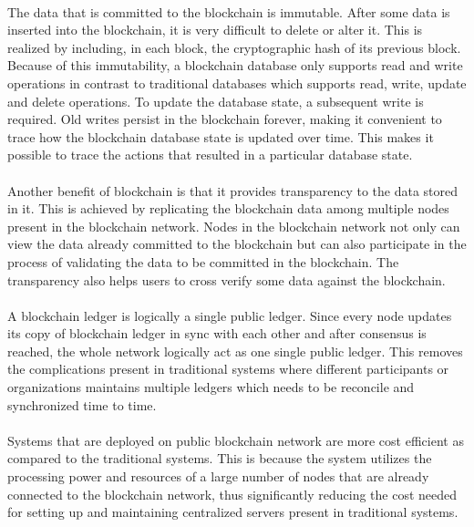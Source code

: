 \documentclass{article}
\begin{document}
        \paragraph{}
        The data that is committed to the blockchain is immutable. After some data is inserted into the blockchain, it is very difficult to delete or alter it. This is realized by including, in each block, the cryptographic hash of its previous block. Because of this immutability, a blockchain database only supports read and write operations in contrast to traditional databases which supports read, write, update and delete operations. To update the database state, a subsequent write is required. Old writes persist in the blockchain forever, making it convenient to trace how the blockchain database state is updated over time. This makes it possible to trace the actions that resulted in a particular database state.

        \paragraph{}
        Another benefit of blockchain is that it provides transparency to the data stored in it. This is achieved by replicating the blockchain data among multiple nodes present in the blockchain network. Nodes in the blockchain network not only can view the data already committed to the blockchain but can also participate in the process of validating the data to be committed in the blockchain. The transparency also helps users to cross verify some data against the blockchain.  

        \paragraph{}
        A blockchain ledger is logically a single public ledger. Since every node updates its copy of blockchain ledger in sync with each other and after consensus is reached, the whole network logically act as one single public ledger. This removes the complications present in traditional systems where different participants or organizations maintains multiple ledgers which needs to be reconcile and synchronized time to time.

        \paragraph{}
        Systems that are deployed on public blockchain network are more cost efficient as compared to the traditional systems. This is because the system utilizes the processing power and resources of a large number of nodes that are already connected to the blockchain network, thus significantly reducing the cost needed for setting up and maintaining centralized servers present in traditional systems.
\end{document}
